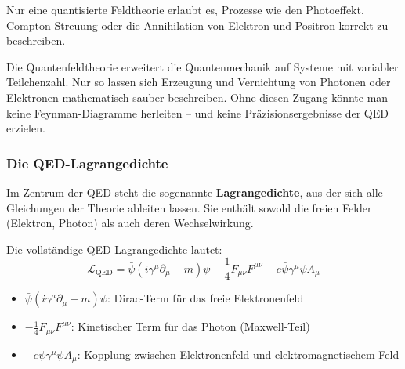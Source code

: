Nur eine quantisierte Feldtheorie erlaubt es, Prozesse wie den Photoeffekt, Compton-Streuung oder die Annihilation von Elektron und Positron korrekt zu beschreiben.

\vspace{0.5em}
\begin{tcolorbox}[didaktikbox, title=Warum nicht einfach klassisch?]
	\label{box:Warum nicht einfach klassisch?}
	Die Quantenfeldtheorie erweitert die Quantenmechanik auf Systeme mit variabler Teilchenzahl. Nur so lassen sich Erzeugung und Vernichtung von Photonen oder Elektronen mathematisch sauber beschreiben. Ohne diesen Zugang könnte man keine Feynman-Diagramme herleiten – und keine Präzisionsergebnisse der QED erzielen.
\end{tcolorbox}

\subsubsection{Die QED-Lagrangedichte}

Im Zentrum der QED steht die sogenannte \textbf{Lagrangedichte}, aus der sich alle Gleichungen der Theorie ableiten lassen. Sie enthält sowohl die freien Felder (Elektron, Photon) als auch deren Wechselwirkung.

Die vollständige QED-Lagrangedichte lautet:
\[
\mathcal{L}_{\text{QED}} = \bar{\psi}(i \gamma^\mu \partial_\mu - m)\psi - \frac{1}{4}F_{\mu\nu}F^{\mu\nu} - e \bar{\psi} \gamma^\mu \psi A_\mu
\]

\begin{tcolorbox}[mathebox, title=Aufbau der QED-Lagrangedichte]
	\label{box:Sufbau der QED-Langrangedichte}
	\begin{itemize}
		\item $\bar{\psi}(i \gamma^\mu \partial_\mu - m)\psi$: Dirac-Term für das freie Elektronenfeld
		\item $-\frac{1}{4}F_{\mu\nu}F^{\mu\nu}$: Kinetischer Term für das Photon (Maxwell-Teil)
		\item $-e \bar{\psi} \gamma^\mu \psi A_\mu$: Kopplung zwischen Elektronenfeld und elektromagnetischem Feld
	\end{itemize}
\end{tcolorbox}

